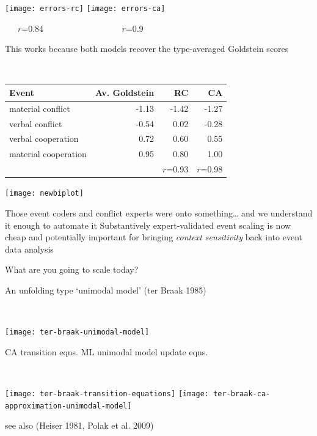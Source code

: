 \documentclass{mediumfoils}
\newcommand{\mkgrey}[1]{{\color{pale}#1}}
\begin{document}
\begin{center}
\texttt{[image: errors-rc]}
\texttt{[image: errors-ca]}
\end{center}
\centerline{~~~$r$=0.84 ~~~~~~~~~~~~~~~~~ $r$=0.9}


This works because both models recover the type-averaged Goldstein scores

~\\
{\small
\begin{center}
\begin{tabular}{lrrr}
  \toprule
Event & Av. Goldstein & RC & CA \\ 
  \midrule
material conflict    & -1.13 &  -1.42 &   -1.27 \\ 
verbal conflict      & -0.54 &   0.02  &  -0.28 \\ 
verbal cooperation   &  0.72  &  0.60  &   0.55 \\ 
material cooperation &  0.95  &  0.80  &   1.00 \\  \midrule
                     &        &  $r$=0.93 & $r$=0.98 \\
\bottomrule
\end{tabular}
\end{center}
}


\begin{center}
\texttt{[image: newbiplot]}
\end{center}




Those event coders and conflict experts were onto something\ldots
\ita
\itm and we understand it enough to automate it
\itz
\pause
Substantively
\ita
\itm expert-validated event scaling is now cheap and potentially important for bringing \textit{context sensitivity} back into event data analysis
\itz


\centerline{What are you going to scale today?}


\slide{}


An unfolding type `unimodal model' \mkgrey{(ter Braak 1985)}

~\\
\centerline{\texttt{[image: ter-braak-unimodal-model]}}

CA transition eqns. \hfill ML unimodal model update eqns.

~\\
\centerline{\texttt{[image: ter-braak-transition-equations]}
\texttt{[image: ter-braak-ca-approximation-unimodal-model]}}

see also \mkgrey{(Heiser 1981, Polak et al. 2009)}
\end{document}
